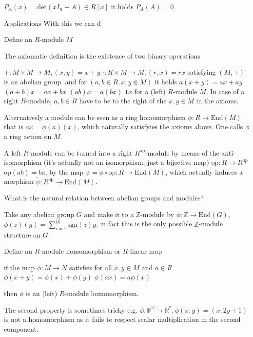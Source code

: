 
\(P_A(x) = \text{det}(xI_n - A) \in R[x]\) it holds \(P_A(A) = 0\).

Applications
With this we can d

Define an \(R\)-module \(M\)

The axiomatic definition is the existence of two binary operations

\(+ : M \times M \to M, (x, y) = x + y\)
\(\cdot : R \times M \to M, (r, x) = rx\)
satisfying
\((M, +)\) is an abelian group.
and for \((a, b \in R, x, y \in M)\) it holds
\(a(x + y) = ax + ay\)
\((a + b)x = ax + bx\)
\((ab)x = a(bx)\)
\(1x\)
for a (left) \(R\)-module \(M\), 
In case of a right \(R\)-module, \(a, b \in R\) have to be to the right
of the \(x, y \in M\) in the axioms.

Alternatively a module can be seen as a ring homomorphism \(\phi: R \to \text{End}(M)\)
that is \(ax = \phi(a)(x)\), which naturally satisfyies the axioms above. 
One calls \(\phi\) a ring action on \(M\).

A left \(R\)-module can be turned into a right \(R^{\text{op}}\)-module by means of the anti-isomorphism
(it's actually not an isomorphism, just a bijective map) \(\text{op} : R \to R^{\text{op}}\) \(\text{op}(ab) = ba\),
by the map \(\psi = \phi\circ\text{op} : R \to \text{End}(M)\), which actually induces a morphism \(\tilde{\psi} : R^{\text{op}} \to \text{End}(M)\).

What is the natural relation between abelian groups
and modules?


Take any abelian group \(G\) and make it to a \(\mathbb{Z}\)-module
by \(\phi : \mathbb{Z} \to \text{End}(G)\), \(\phi(z)(g) = \sum_{i = 1}^{|z|} \text{sgn}(z)g\), in fact this
is the only possible \(\mathbb{Z}\)-module structure on \(G\).


Define an \(R\)-module homomorphism or \(R\)-linear map

if the map \(\phi : M \to N\) satisfies for all \(x, y \in M\) and \(a \in R\)
\(\phi(x + y) = \phi(x) + \phi(y)\)
\(\phi(ax) = a\phi(x)\)

then \(\phi\) is an (left) \(R\)-module homomorphism. 

The second property is sometimes tricky e.g. \(\phi : \mathbb{R}^2 \to \mathbb{R}^2, \phi(x, y) = (x, 2y + 1)\) is not a homomorphism
as it fails to respect scalar multiplication in the second component.

